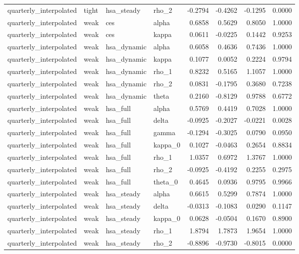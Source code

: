 \begin{tabular}{llllrrrr}
quarterly\_interpolated & tight & hsa\_steady & rho\_2 & -0.2794 & -0.4262 & -0.1295 & 0.0000 \\
quarterly\_interpolated & weak & ces & alpha & 0.6858 & 0.5629 & 0.8050 & 1.0000 \\
quarterly\_interpolated & weak & ces & kappa & 0.0611 & -0.0225 & 0.1442 & 0.9253 \\
quarterly\_interpolated & weak & hsa\_dynamic & alpha & 0.6058 & 0.4636 & 0.7436 & 1.0000 \\
quarterly\_interpolated & weak & hsa\_dynamic & kappa & 0.1077 & 0.0052 & 0.2224 & 0.9794 \\
quarterly\_interpolated & weak & hsa\_dynamic & rho\_1 & 0.8232 & 0.5165 & 1.1057 & 1.0000 \\
quarterly\_interpolated & weak & hsa\_dynamic & rho\_2 & 0.0831 & -0.1795 & 0.3680 & 0.7238 \\
quarterly\_interpolated & weak & hsa\_dynamic & theta & 0.2160 & -0.8129 & 0.9788 & 0.6772 \\
quarterly\_interpolated & weak & hsa\_full & alpha & 0.5769 & 0.4419 & 0.7028 & 1.0000 \\
quarterly\_interpolated & weak & hsa\_full & delta & -0.0925 & -0.2027 & -0.0221 & 0.0028 \\
quarterly\_interpolated & weak & hsa\_full & gamma & -0.1294 & -0.3025 & 0.0790 & 0.0950 \\
quarterly\_interpolated & weak & hsa\_full & kappa\_0 & 0.1027 & -0.0463 & 0.2654 & 0.8834 \\
quarterly\_interpolated & weak & hsa\_full & rho\_1 & 1.0357 & 0.6972 & 1.3767 & 1.0000 \\
quarterly\_interpolated & weak & hsa\_full & rho\_2 & -0.0925 & -0.4192 & 0.2255 & 0.2975 \\
quarterly\_interpolated & weak & hsa\_full & theta\_0 & 0.4645 & 0.0936 & 0.9795 & 0.9966 \\
quarterly\_interpolated & weak & hsa\_steady & alpha & 0.6615 & 0.5299 & 0.7874 & 1.0000 \\
quarterly\_interpolated & weak & hsa\_steady & delta & -0.0313 & -0.1083 & 0.0290 & 0.1147 \\
quarterly\_interpolated & weak & hsa\_steady & kappa\_0 & 0.0628 & -0.0504 & 0.1670 & 0.8900 \\
quarterly\_interpolated & weak & hsa\_steady & rho\_1 & 1.8794 & 1.7873 & 1.9654 & 1.0000 \\
quarterly\_interpolated & weak & hsa\_steady & rho\_2 & -0.8896 & -0.9730 & -0.8015 & 0.0000 \\

\end{tabular}
